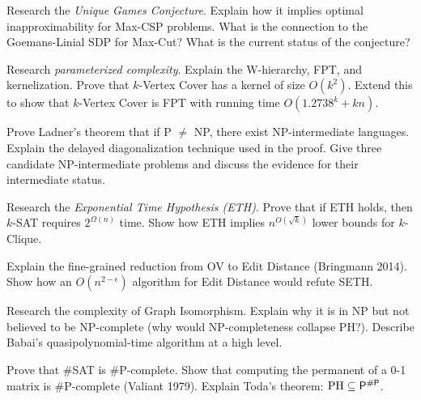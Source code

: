 \begin{exercise}[Challenge]
Research the \emph{Unique Games Conjecture}. Explain how it implies optimal inapproximability for Max-CSP problems. What is the connection to the Goemans-Linial SDP for Max-Cut? What is the current status of the conjecture?
\end{exercise}

\begin{exercise}[Challenge]
Research \emph{parameterized complexity}. Explain the W-hierarchy, FPT, and kernelization. Prove that $k$-Vertex Cover has a kernel of size $O(k^2)$. Extend this to show that $k$-Vertex Cover is FPT with running time $O(1.2738^k + kn)$.
\end{exercise}

\begin{exercise}[Challenge]
Prove Ladner's theorem that if P $\neq$ NP, there exist NP-intermediate languages. Explain the delayed diagonalization technique used in the proof. Give three candidate NP-intermediate problems and discuss the evidence for their intermediate status.
\end{exercise}

\begin{exercise}[Challenge]
Research the \emph{Exponential Time Hypothesis (ETH)}. Prove that if ETH holds, then $k$-SAT requires $2^{\Omega(n)}$ time. Show how ETH implies $n^{O(\sqrt{k})}$ lower bounds for $k$-Clique.
\end{exercise}

\begin{exercise}[Challenge]
Explain the fine-grained reduction from OV to Edit Distance (Bringmann 2014). Show how an $O(n^{2-\epsilon})$ algorithm for Edit Distance would refute SETH.
\end{exercise}

\begin{exercise}[Challenge]
Research the complexity of Graph Isomorphism. Explain why it is in NP but not believed to be NP-complete (why would NP-completeness collapse PH?). Describe Babai's quasipolynomial-time algorithm at a high level.
\end{exercise}

\begin{exercise}[Challenge]
Prove that \#SAT is \#P-complete. Show that computing the permanent of a 0-1 matrix is \#P-complete (Valiant 1979). Explain Toda's theorem: $\text{PH} \subseteq \mathsf{P}^{\#\mathsf{P}}$.
\end{exercise}

